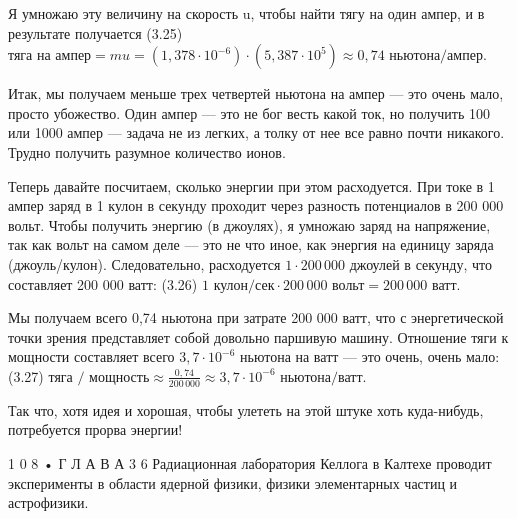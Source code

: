 \documentclass[10pt,oneside]{article}
\newcommand{\TipsSubsection}[1]{\par\vspace{6bp}{\normalsize\bfseries #1\par}\vspace{2bp}}
\begin{document}
Я умножаю эту величину на скорость u, чтобы найти тягу на один ампер, и в результате получается (3.25) \(\text{тяга на ампер} = mu = (1{,}378 \cdot 10^{-6}) \cdot (5{,}387 \cdot 10^{5}) \approx 0{,}74\text{ ньютона/ампер}.\)\par

Итак, мы получаем меньше трех четвертей ньютона на ампер --- это очень мало, просто убожество. Один ампер --- это не бог весть какой ток, но получить 100 или 1000 ампер --- задача не из легких, а толку от нее все равно почти никакого. Трудно получить разумное количество ионов.\par

Теперь давайте посчитаем, сколько энергии при этом расходуется. При токе в 1 ампер заряд в 1 кулон в секунду проходит через разность потенциалов в 200 000 вольт. Чтобы получить энергию (в джоулях), я умножаю заряд на напряжение, так как вольт на самом деле --- это не что иное, как энергия на единицу заряда (джоуль/кулон). Следовательно, расходуется \(1 \cdot 200\,000\) джоулей в секунду, что составляет 200 000 ватт: (3.26) \(1\text{ кулон/сек} \cdot 200\,000\text{ вольт} = 200\,000\text{ ватт}.\)\par

Мы получаем всего 0,74 ньютона при затрате 200 000 ватт, что с энергетической точки зрения представляет собой довольно паршивую машину. Отношение тяги к мощности составляет всего \(3{,}7 \cdot 10^{-6}\) ньютона на ватт --- это очень, очень мало: (3.27) \(\text{тяга / мощность} \approx \frac{0{,}74}{200\,000} \approx 3{,}7 \cdot 10^{-6}\text{ ньютона/ватт}.\)\par

Так что, хотя идея и хорошая, чтобы улететь на этой штуке хоть куда-нибудь, потребуется прорва энергии!\par

1 0 8 • Г Л А В А  3 6 Радиационная лаборатория Келлога в Калтехе проводит эксперименты в области ядерной физики, физики элементарных частиц и астрофизики.\par

\TipsSubsection{3-8 Электростатический отклонитель протонного пучка Следующая задача, которую я придумал, чтобы показать, на что вы способны, такова. В Лаборатории Келлога6 у нас есть генератор Ван де Граафа, ускоряющий протоны до напряжения 2 миллиона вольт. Разность потенциалов создается электростатически с помощью движущейся ленты. Протоны проходят через этот потенциал, приобретают большую энергию и вылетают в виде пучка.}
\end{document}
